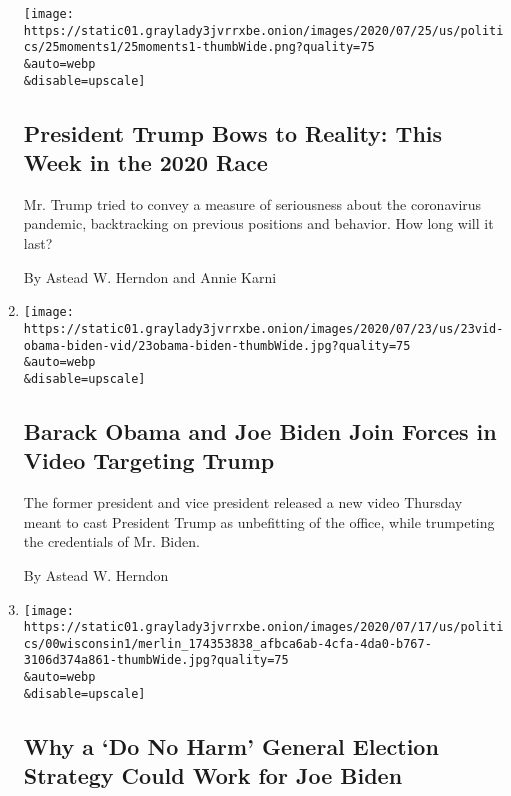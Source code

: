 \begin{enumerate}
  \texttt{[image: https://static01.graylady3jvrrxbe.onion/images/2020/07/25/us/politics/25moments1/25moments1-thumbWide.png?quality=75\\\&auto=webp\\\&disable=upscale]}

  \hypertarget{president-trump-bows-to-reality-this-week-in-the-2020-race}{%
  \subsection{President Trump Bows to Reality: This Week in the 2020
  Race}\label{president-trump-bows-to-reality-this-week-in-the-2020-race}}

  Mr. Trump tried to convey a measure of seriousness about the
  coronavirus pandemic, backtracking on previous positions and behavior.
  How long will it last?

  By Astead W. Herndon and Annie Karni
\item
  \href{/2020/07/23/us/politics/barack-obama-joe-biden-video.html}{}

  \texttt{[image: https://static01.graylady3jvrrxbe.onion/images/2020/07/23/us/23vid-obama-biden-vid/23obama-biden-thumbWide.jpg?quality=75\\\&auto=webp\\\&disable=upscale]}

  \hypertarget{barack-obama-and-joe-biden-join-forces-in-video-targeting-trump}{%
  \subsection{Barack Obama and Joe Biden Join Forces in Video Targeting
  Trump}\label{barack-obama-and-joe-biden-join-forces-in-video-targeting-trump}}

  The former president and vice president released a new video Thursday
  meant to cast President Trump as unbefitting of the office, while
  trumpeting the credentials of Mr. Biden.

  By Astead W. Herndon
\item
  \href{/2020/07/19/us/politics/joe-biden-wisconsin-election.html}{}

  \texttt{[image: https://static01.graylady3jvrrxbe.onion/images/2020/07/17/us/politics/00wisconsin1/merlin\_174353838\_afbca6ab-4cfa-4da0-b767-3106d374a861-thumbWide.jpg?quality=75\\\&auto=webp\\\&disable=upscale]}

  \hypertarget{why-a-do-no-harm-general-election-strategy-could-work-for-joe-biden}{%
  \subsection{Why a `Do No Harm' General Election Strategy Could Work
  for Joe
  Biden}\label{why-a-do-no-harm-general-election-strategy-could-work-for-joe-biden}}


\end{enumerate}
